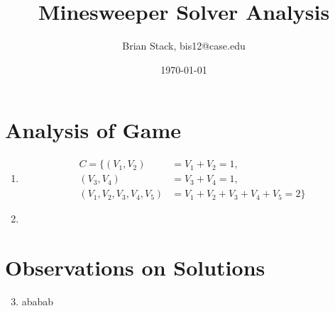 \documentclass[11pt,letterpaper,notitlepage]{report}
\title{Minesweeper Solver Analysis}
\author{Brian Stack, bis12@case.edu}
\date{\today}
\begin{document}
\maketitle
\section*{Analysis of Game}
\begin{enumerate}
\item 
\begin{align*}
C = \{ (V_1, V_2) &= V_1 + V_2 = 1,\\
       (V_3, V_4) &= V_3 + V_4 = 1,\\
       (V_1, V_2, V_3, V_4, V_5) &= V_1 + V_2 + V_3 + V_4 + V_5 = 2\}
\end{align*}
\item ~\\
\end{enumerate}
\section*{Observations on Solutions}
\begin{enumerate}
\setcounter{enumi}{2}
\item ababab
\end{enumerate}
\end{document}

